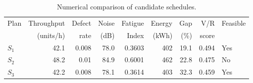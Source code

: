 \begin{table}[htbp]
\centering
\caption{Numerical comparison of candidate schedules.}
\label{tab:numerical-sim}
\small
\begin{tabular}{@{}lrrrrrrrl@{}}
\toprule
Plan & Throughput & Defect & Noise & Fatigue & Energy & Gap & V/R & Feasible \\
     & (units/h)  & rate   & (dB)  & Index   & (kWh)  & (\%) & score &         \\
\midrule
$S_{1}$ & 42.1 & 0.008 & 78.0 & 0.3603 & 402 & 19.1 & 0.494 & Yes \\
$S_{2}$ & 48.2 & 0.01 & 84.9 & 0.6001 & 462 & 22.8 & 0.475 & No \\
$S_{3}$ & 42.2 & 0.008 & 78.1 & 0.3614 & 403 & 32.3 & 0.459 & Yes \\
\bottomrule
\end{tabular}
\end{table}
